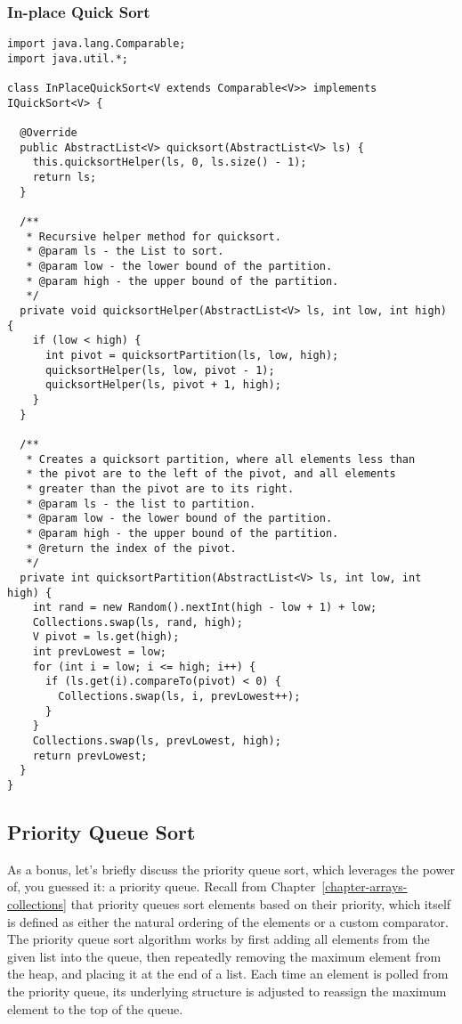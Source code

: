 \subsubsection*{In-place Quick Sort}
\begin{lstlisting}[language=MyJava]
import java.lang.Comparable;
import java.util.*;

class InPlaceQuickSort<V extends Comparable<V>> implements IQuickSort<V> {

  @Override
  public AbstractList<V> quicksort(AbstractList<V> ls) {
    this.quicksortHelper(ls, 0, ls.size() - 1);
    return ls;
  }

  /**
   * Recursive helper method for quicksort.
   * @param ls - the List to sort.
   * @param low - the lower bound of the partition.
   * @param high - the upper bound of the partition.
   */
  private void quicksortHelper(AbstractList<V> ls, int low, int high) {
    if (low < high) {
      int pivot = quicksortPartition(ls, low, high);
      quicksortHelper(ls, low, pivot - 1);
      quicksortHelper(ls, pivot + 1, high);
    }
  }

  /**
   * Creates a quicksort partition, where all elements less than 
   * the pivot are to the left of the pivot, and all elements 
   * greater than the pivot are to its right.
   * @param ls - the list to partition.
   * @param low - the lower bound of the partition.
   * @param high - the upper bound of the partition.
   * @return the index of the pivot.
   */
  private int quicksortPartition(AbstractList<V> ls, int low, int high) {
    int rand = new Random().nextInt(high - low + 1) + low;
    Collections.swap(ls, rand, high);
    V pivot = ls.get(high);
    int prevLowest = low;
    for (int i = low; i <= high; i++) {
      if (ls.get(i).compareTo(pivot) < 0) {
        Collections.swap(ls, i, prevLowest++);
      }
    }
    Collections.swap(ls, prevLowest, high);
    return prevLowest;
  }
}
\end{lstlisting}

\newpage
\subsection{Priority Queue Sort}
As a bonus, let's briefly discuss the priority queue sort, which leverages the power of, you guessed it: a priority queue.
Recall from Chapter~\ref{chapter-arrays-collections} that priority queues sort elements based on their priority, which itself is defined as either the natural ordering of the elements or a custom comparator. 
The priority queue sort algorithm works by first adding all elements from the given list into the queue, then repeatedly removing the maximum element from the heap, and placing it at the end of a list. 
Each time an element is polled from the priority queue, its underlying structure is adjusted to reassign the maximum element to the top of the queue.

